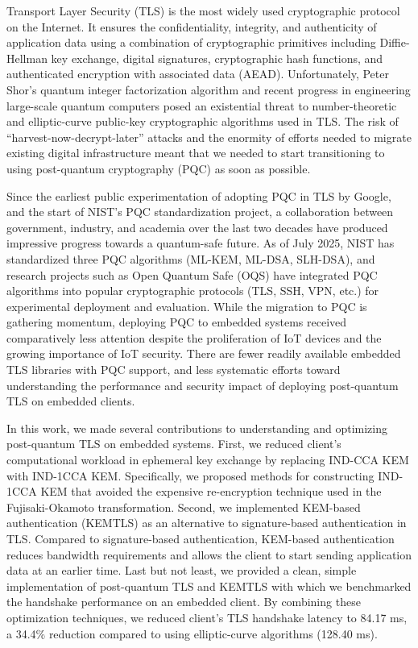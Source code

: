 \documentclass[letterpaper,12pt,titlepage,oneside,final]{book}
\begin{document}
Transport Layer Security (TLS) is the most widely used cryptographic protocol on the Internet.
It ensures the confidentiality, integrity, and authenticity of application data using a combination of cryptographic primitives including Diffie-Hellman key exchange, digital signatures, cryptographic hash functions, and authenticated encryption with associated data (AEAD).
Unfortunately, Peter Shor's quantum integer factorization algorithm and recent progress in engineering large-scale quantum computers posed an existential threat to number-theoretic and elliptic-curve public-key cryptographic algorithms used in TLS.
The risk of ``harvest-now-decrypt-later'' attacks and the enormity of efforts needed to migrate existing digital infrastructure meant that we needed to start transitioning to using post-quantum cryptography (PQC) as soon as possible.

Since the earliest public experimentation of adopting PQC in TLS by Google, and the start of NIST's PQC standardization project, a collaboration between government, industry, and academia over the last two decades have produced impressive progress towards a quantum-safe future.
As of July 2025, NIST has standardized three PQC algorithms (ML-KEM, ML-DSA, SLH-DSA), and research projects such as Open Quantum Safe (OQS) have integrated PQC algorithms into popular cryptographic protocols (TLS, SSH, VPN, etc.) for experimental deployment and evaluation.
While the migration to PQC is gathering momentum, deploying PQC to embedded systems received comparatively less attention despite the proliferation of IoT devices and the growing importance of IoT security.
There are fewer readily available embedded TLS libraries with PQC support, and less systematic efforts toward understanding the performance and security impact of deploying post-quantum TLS on embedded clients.

In this work, we made several contributions to understanding and optimizing post-quantum TLS on embedded systems.
First, we reduced client's computational workload in ephemeral key exchange by replacing IND-CCA KEM with IND-1CCA KEM.
Specifically, we proposed methods for constructing IND-1CCA KEM that avoided the expensive re-encryption technique used in the Fujisaki-Okamoto transformation.
Second, we implemented KEM-based authentication (KEMTLS) as an alternative to signature-based authentication in TLS.
Compared to signature-based authentication, KEM-based authentication reduces bandwidth requirements and allows the client to start sending application data at an earlier time.
Last but not least, we provided a clean, simple implementation of post-quantum TLS and KEMTLS with which we benchmarked the handshake performance on an embedded client.
By combining these optimization techniques, we reduced client's TLS handshake latency to 84.17 ms, a 34.4\% reduction compared to using elliptic-curve algorithms (128.40 ms).
\end{document}
